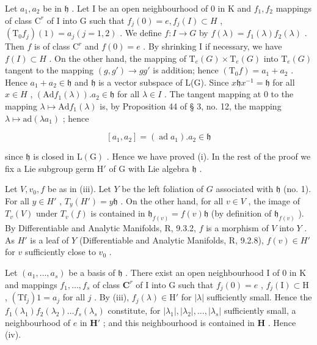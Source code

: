 Let \(a_1, a_2\) be in \(\mathfrak{h}\) . Let I be an open neighbourhood of 0 in K and \(f_1, f_2\) mappings of class \(\mathrm{C}^r\) of I into G such that \(f_j(0) = e, f_j(I) \subset H\) , \((\mathrm{T}_0 f_j)(1) = a_j (j = 1, 2)\) . We define \(f: I \to G\) by \(f(\lambda) = f_1(\lambda)f_2(\lambda)\) . Then \(f\) is of class \(\mathrm{C}^r\) and \(f(0) = e\) . By shrinking I if necessary, we have \(f(I) \subset H\) . On the other hand, the mapping of \(\mathrm{T}_e(G) \times \mathrm{T}_e(G)\) into \(\mathrm{T}_e(G)\) tangent to the mapping \((g, g') \to gg'\) is addition; hence \((\mathrm{T}_0 f) = a_1 + a_2\) . Hence \(a_1 + a_2 \in \mathfrak{h}\) and \(\mathfrak{h}\) is a vector subspace of L(G). Since \(x\mathfrak{h}x^{-1} = \mathfrak{h}\) for all \(x \in H\) , \((\mathrm{Ad}f_1(\lambda)).a_2 \in \mathfrak{h}\) for all \(\lambda \in I\) . The tangent mapping at 0 to the mapping \(\lambda \mapsto \mathrm{Ad}f_1(\lambda)\) is, by Proposition 44 of § 3, no. 12, the mapping \(\lambda \mapsto \mathrm{ad}(\lambda a_1)\) ; hence

\[
\left[ a _ {1}, a _ {2} \right] = (\operatorname{ad} a _ {1}). a _ {2} \in \mathfrak {h}
\]

since \(\mathfrak{h}\) is closed in \(\mathrm{L}(\mathrm{G})\) . Hence we have proved (i). In the rest of the proof we fix a Lie subgroup germ \(\mathrm{H}'\) of \(\mathrm{G}\) with Lie algebra \(\mathfrak{h}\) .

Let \(V, v_0, f\) be as in (iii). Let \(Y\) be the left foliation of \(G\) associated with \(\mathfrak{h}\) (no. 1). For all \(y \in H'\) , \(T_y(H') = y\mathfrak{h}\) . On the other hand, for all \(v \in V\) , the image of \(T_v(V)\) under \(T_v(f)\) is contained in \(\mathfrak{h}_{f(v)} = f(v)\mathfrak{h}\) (by definition of \(\mathfrak{h}_{f(v)}\) ). By Differentiable and Analytic Manifolds, R, 9.3.2, \(f\) is a morphism of \(V\) into \(Y\) . As \(H'\) is a leaf of \(Y\) (Differentiable and Analytic Manifolds, R, 9.2.8), \(f(v) \in H'\) for \(v\) sufficiently close to \(v_0\) .

Let \((a_{1},\ldots ,a_{s})\) be a basis of \(\mathfrak{h}\) . There exist an open neighbourhood I of 0 in K and mappings \(f_{1},\ldots ,f_{s}\) of class \(\mathbf{C}^r\) of I into G such that \(f_{j}(0) = e\) , \(f_{j}(\mathrm{I})\subset \mathrm{H}\) , \((\mathrm{Tf}_j)1 = a_j\) for all \(j\) . By (iii), \(f_{j}(\lambda)\in \mathrm{H}'\) for \(|\lambda |\) sufficiently small. Hence the \(f_{1}(\lambda_{1})f_{2}(\lambda_{2})\ldots f_{s}(\lambda_{s})\) constitute, for \(|\lambda_1|,\left|\lambda_2\right|,\ldots ,|\lambda_s|\) sufficiently small, a neighbourhood of \(e\) in \(\mathbf{H}'\) ; and this neighbourhood is contained in \(\mathbf{H}\) . Hence (iv).

